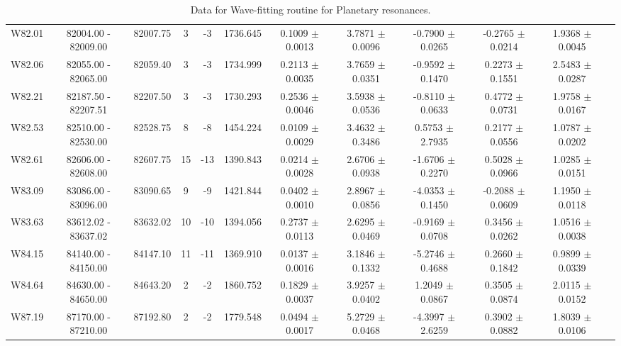 \documentclass{article}
\begin{document}
\begin{table}[h]
{\begin{tabular}{|c|c|c|c|c|c|c|c|c|c|c|c|}
W82.01 & 82004.00 - 82009.00 & 82007.75 & 3 & -3 & 1736.645 & 0.1009 $\pm$ 0.0013 & 3.7871 $\pm$ 0.0096 &   -0.7900 $\pm$ 0.0265 & -0.2765 $\pm$ 0.0214 & 1.9368 $\pm$ 0.0045 \\
         
W82.06 & 82055.00 - 82065.00 & 82059.40 & 3 & -3 & 1734.999 & 0.2113 $\pm$ 0.0035 & 3.7659 $\pm$ 0.0351 &  -0.9592 $\pm$ 0.1470 & 0.2273 $\pm$ 0.1551 & 2.5483 $\pm$ 0.0287 \\

W82.21 & 82187.50 - 82207.51 & 82207.50 & 3 & -3 & 1730.293 & 0.2536 $\pm$ 0.0046 & 3.5938 $\pm$ 0.0536 &  -0.8110 $\pm$ 0.0633 & 0.4772 $\pm$ 0.0731 & 1.9758 $\pm$ 0.0167 \\

W82.53 & 82510.00 - 82530.00 & 82528.75 & 8 & -8 & 1454.224 & 0.0109 $\pm$ 0.0029 & 3.4632 $\pm$ 0.3486 &  0.5753 $\pm$ 2.7935 & 0.2177 $\pm$ 0.0556 & 1.0787 $\pm$ 0.0202 \\

W82.61 & 82606.00 - 82608.00 & 82607.75 & 15 & -13 & 1390.843 & 0.0214 $\pm$ 0.0028 & 2.6706 $\pm$ 0.0938 &  -1.6706 $\pm$ 0.2270 & 0.5028 $\pm$ 0.0966 & 1.0285 $\pm$ 0.0151 \\
         
W83.09 & 83086.00 - 83096.00 & 83090.65 & 9 & -9 & 1421.844 & 0.0402 $\pm$ 0.0010 & 2.8967 $\pm$ 0.0856 &  -4.0353 $\pm$ 0.1450 & -0.2088 $\pm$ 0.0609 & 1.1950 $\pm$ 0.0118 \\

W83.63 & 83612.02 - 83637.02 & 83632.02 & 10 & -10 & 1394.056 & 0.2737 $\pm$ 0.0113 & 2.6295 $\pm$ 0.0469 & -0.9169 $\pm$ 0.0708 & 0.3456 $\pm$ 0.0262 & 1.0516 $\pm$ 0.0038 \\

W84.15 & 84140.00 - 84150.00 & 84147.10 & 11 & -11 & 1369.910 & 0.0137 $\pm$ 0.0016 & 3.1846 $\pm$ 0.1332 & -5.2746 $\pm$ 0.4688 & 0.2660 $\pm$ 0.1842 & 0.9899 $\pm$ 0.0339 \\

W84.64 & 84630.00 - 84650.00 & 84643.20 & 2 & -2 & 1860.752 & 0.1829 $\pm$ 0.0037 & 3.9257 $\pm$ 0.0402 &  1.2049 $\pm$ 0.0867 & 0.3505 $\pm$ 0.0874 & 2.0115 $\pm$ 0.0152 \\

W87.19 & 87170.00 - 87210.00 & 87192.80 & 2 & -2 & 1779.548 & 0.0494 $\pm$ 0.0017 & 5.2729 $\pm$ 0.0468 & -4.3997 $\pm$ 2.6259 & 0.3902 $\pm$ 0.0882 & 1.8039 $\pm$ 0.0106 \\

\hline
\end{tabular}
\vspace{-1.5cm} %
}
\caption{Data for Wave-fitting routine for Planetary resonances.}
\end{table}
\end{document}
